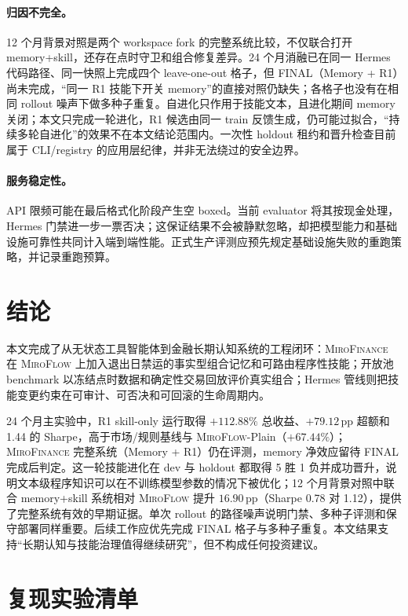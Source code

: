 \documentclass[11pt]{article}
\newcommand{\miroflow}{\textsc{MiroFlow}}
\newcommand{\memskill}{\textsc{MiroFinance}}
\newcommand{\pp}{\,\mathrm{pp}}
\begin{document}
\paragraph{归因不完全。}
12 个月背景对照是两个 workspace fork 的完整系统比较，不仅联合打开 memory+skill，还存在点时守卫和组合修复差异。24 个月消融已在同一 Hermes 代码路径、同一快照上完成四个 leave-one-out 格子，但 FINAL（Memory + R1）尚未完成，``同一 R1 技能下开关 memory''的直接对照仍缺失；各格子也没有在相同 rollout 噪声下做多种子重复。自进化只作用于技能文本，且进化期间 memory 关闭；本文只完成一轮进化，R1 候选由同一 train 反馈生成，仍可能过拟合，``持续多轮自进化''的效果不在本文结论范围内。一次性 holdout 租约和晋升检查目前属于 CLI/registry 的应用层纪律，并非无法绕过的安全边界。

\paragraph{服务稳定性。}
API 限频可能在最后格式化阶段产生空 boxed。当前 evaluator 将其按现金处理，Hermes 门禁进一步一票否决；这保证结果不会被静默忽略，却把模型能力和基础设施可靠性共同计入端到端性能。正式生产评测应预先规定基础设施失败的重跑策略，并记录重跑预算。

\section{结论}
\label{sec:conclusion}

本文完成了从无状态工具智能体到金融长期认知系统的工程闭环：\memskill{} 在 \miroflow{} 上加入退出日禁运的事实型组合记忆和可路由程序性技能；开放池 benchmark 以冻结点时数据和确定性交易回放评价真实组合；Hermes 管线则把技能变更约束在可审计、可否决和可回滚的生命周期内。

24 个月主实验中，R1 skill-only 运行取得 $+112.88\%$ 总收益、$+79.12\pp$ 超额和 1.44 的 Sharpe，高于市场/规则基线与 \miroflow{}-Plain（$+67.44\%$）；\memskill{} 完整系统（Memory + R1）仍在评测，memory 净效应留待 FINAL 完成后判定。这一轮技能进化在 dev 与 holdout 都取得 5 胜 1 负并成功晋升，说明文本级程序知识可以在不训练模型参数的情况下被优化；12 个月背景对照中联合 memory+skill 系统相对 \miroflow{} 提升 $16.90\pp$（Sharpe 0.78 对 1.12），提供了完整系统有效的早期证据。单次 rollout 的路径噪声说明门禁、多种子评测和保守部署同样重要。后续工作应优先完成 FINAL 格子与多种子重复。本文结果支持``长期认知与技能治理值得继续研究''，但不构成任何投资建议。



\appendix

\section{复现实验清单}
\label{sec:appendix-repro}
\end{document}
